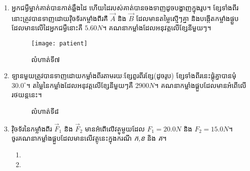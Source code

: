 \begin{enumerate}
	\item អ្នកជម្ងឺម្នាក់គាត់បានកាត់ឆ្អឹងដៃ ហើយដៃរបស់គាត់បានចងទាញដូចបង្ហាញក្នុងរូប។ ខ្សែទាំងពីរនោះត្រូវបានទាញដោយវ៉ិចទ័រកម្លាំងពីរគឺ $\overrightarrow{A}$ និង $\overrightarrow{B}$ ដែលមានតម្លៃស្មើៗគ្នា និងបង្កើតកម្លាំងផ្គួបដែលមានលើដៃអ្នកជម្ងឺនោះគឺ $5.60N$។ គណនាកម្លាំងដែលអនុវត្តលើខ្សែនីមួយៗ។
	\begin{figure}[H]
		\centering
		\texttt{[image: patient]}
		\caption{លំហាត់ទី៧}
	\end{figure}
	\item ឡានមួយត្រូវបានទាញដោយកម្លាំងពីរតាមរយៈខ្សែពួរពីរខ្សែ(ដូចរូប) ខ្សែទាំងពីរនេះផ្គុំគ្នាបានមុំ $30.0^\circ $។ តម្លៃនៃកម្លាំងដែលអនុវត្តលើខ្សែនីមួយៗគឺ $2900N$។ គណនាកម្លាំងផ្គួបដែលមានអំពើលើរថយន្តនេះ។
	\begin{figure}[H]
		\centering
		\caption{លំហាត់ទី៨}
	\end{figure}
	\item វ៉ិចទ័រនៃកម្លាំងពីរ $\overrightarrow{F}_{1}$ និង $\overrightarrow{F}_{2}$ មានអំពើលើវត្ថុមួយដែល $F_{1}=20.0N$ និង $F_{2}=15.0N$។\\ ចូរគណនាកម្លាំងផ្គួបដែលមានលើវត្ថុនេះក្នុងករណី \emph{\kml ក,ខ} និង \emph{\kml គ}។
	\begin{enumerate}[k,3]
		\item {}
		\item \begin{tikzpicture}

\end{tikzpicture}
\end{enumerate}
\end{enumerate}
